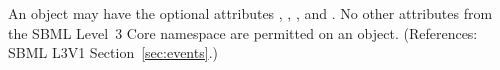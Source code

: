 An \Event object  may have the optional
attributes , , , and .
No other attributes from the SBML Level~3 Core namespace are permitted on
an \Event object.  (References: SBML L3V1 Section~\ref{sec:events}.)
